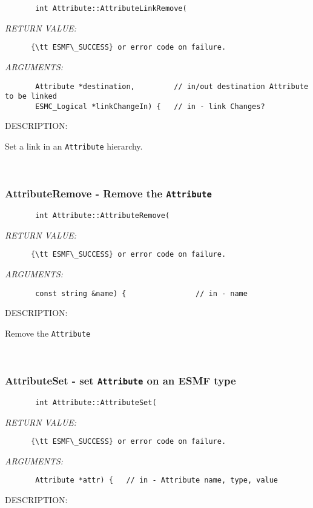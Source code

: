   
\begin{verbatim}       int Attribute::AttributeLinkRemove(\end{verbatim}{\em RETURN VALUE:}
\begin{verbatim}      {\tt ESMF\_SUCCESS} or error code on failure.
   \end{verbatim}{\em ARGUMENTS:}
\begin{verbatim}       Attribute *destination,         // in/out destination Attribute to be linked
       ESMC_Logical *linkChangeIn) {   // in - link Changes?\end{verbatim}
{\sf DESCRIPTION:\\ }


       Set a link in an {\tt Attribute} hierarchy.
   
 
\mbox{}\hrulefill\
 
\subsubsection [AttributeRemove] {AttributeRemove - Remove the {\tt Attribute}}


  
\begin{verbatim}       int Attribute::AttributeRemove(
   \end{verbatim}{\em RETURN VALUE:}
\begin{verbatim}      {\tt ESMF\_SUCCESS} or error code on failure.
   \end{verbatim}{\em ARGUMENTS:}
\begin{verbatim}       const string &name) {                // in - name
   \end{verbatim}
{\sf DESCRIPTION:\\ }


       Remove the {\tt Attribute} 
  
 
\mbox{}\hrulefill\
 
\subsubsection [AttributeSet] {AttributeSet - set {\tt Attribute} on an ESMF type}


  
\begin{verbatim}       int Attribute::AttributeSet(\end{verbatim}{\em RETURN VALUE:}
\begin{verbatim}      {\tt ESMF\_SUCCESS} or error code on failure.
   \end{verbatim}{\em ARGUMENTS:}
\begin{verbatim}       Attribute *attr) {   // in - Attribute name, type, value
   \end{verbatim}
{\sf DESCRIPTION:\\ }


